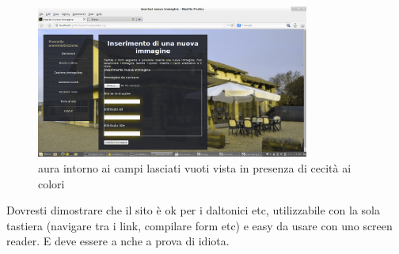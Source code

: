 	\begin{figure}[H]
		\centering \includegraphics[width=0.8\textwidth]{images/color4.png}
		\caption{aura intorno ai campi lasciati vuoti vista in presenza di cecità ai colori}
	\end{figure}
Dovresti dimostrare che il sito è ok per i daltonici etc, utilizzabile con la sola tastiera (navigare tra i link, compilare form etc) e easy da usare con uno screen reader. E deve essere a nche a prova di idiota.